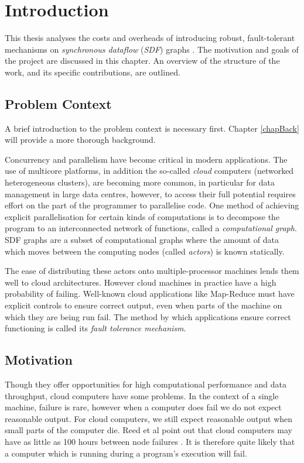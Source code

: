 \chapter{Introduction}

This thesis analyses the costs and overheads of introducing robust, fault-tolerant mechanisms on {\em synchronous dataflow} ({\em SDF}) graphs \cite{sdfBook}.
The motivation and goals of the project are discussed in this chapter.
An overview of the structure of the work, and its specific contributions, are outlined.

\section{Problem Context}

A brief introduction to the problem context is necessary first.
Chapter \ref{chapBack} will provide a more thorough background.

Concurrency and parallelism have become critical in modern applications.
The use of multicore platforms, in addition the so-called {\em cloud} computers (networked heterogeneous clusters), are becoming more common, in particular for data management in large data centres, however, to access their full potential requires effort on the part of the programmer to parallelise code.
One method of achieving explicit parallelisation for certain kinds of computations is to decompose the program to an interconnected network of functions, called a {\em computational graph}.
SDF graphs are a subset of computational graphs where the amount of data which moves between the computing nodes (called {\em actors}) is known statically.

The ease of distributing these actors onto multiple-processor machines lends them well to cloud architectures.
However cloud machines in practice have a high probability of failing.
Well-known cloud applications like Map-Reduce \cite{dea08} must have explicit controls to ensure correct output, even when parts of the machine on which they are being run fail.
The method by which applications ensure correct functioning is called its {\em fault tolerance mechanism}.

\section{Motivation}

Though they offer opportunities for high computational performance and data throughput, cloud computers have some problems.
In the context of a single machine, failure is rare, however when a computer does fail we do not expect reasonable output.
For cloud computers, we still expect reasonable output when small parts of the computer die.
Reed et al point out that cloud computers may have as little as 100 hours between node failures \cite{ree06}.
It is therefore quite likely that a computer which is running during a program's execution will fail.

